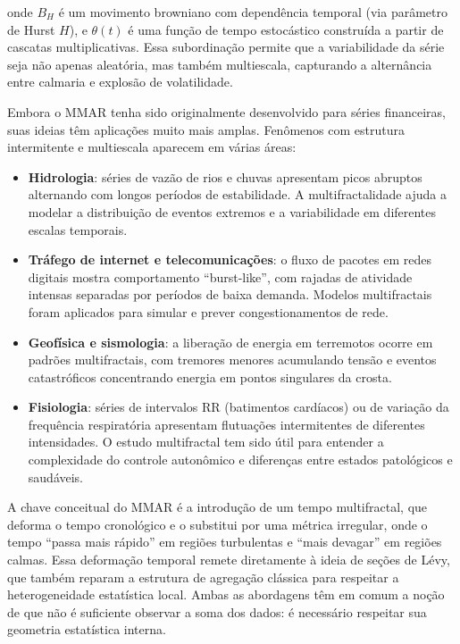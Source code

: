 \documentclass[
]{agujournal2019}
\providecommand{\tightlist}{%
  \setlength{\itemsep}{0pt}\setlength{\parskip}{0pt}}\usepackage{longtable,booktabs,array}
\begin{document}
onde \(B_H\) é um movimento browniano com dependência temporal (via
parâmetro de Hurst \(H\)), e \(\theta(t)\) é uma função de tempo
estocástico construída a partir de cascatas multiplicativas. Essa
subordinação permite que a variabilidade da série seja não apenas
aleatória, mas também multiescala, capturando a alternância entre
calmaria e explosão de volatilidade.

Embora o MMAR tenha sido originalmente desenvolvido para séries
financeiras, suas ideias têm aplicações muito mais amplas. Fenômenos com
estrutura intermitente e multiescala aparecem em várias áreas:

\begin{itemize}
\tightlist
\item
  \textbf{Hidrologia}: séries de vazão de rios e chuvas apresentam picos
  abruptos alternando com longos períodos de estabilidade. A
  multifractalidade ajuda a modelar a distribuição de eventos extremos e
  a variabilidade em diferentes escalas temporais.
\item
  \textbf{Tráfego de internet e telecomunicações}: o fluxo de pacotes em
  redes digitais mostra comportamento ``burst-like'', com rajadas de
  atividade intensas separadas por períodos de baixa demanda. Modelos
  multifractais foram aplicados para simular e prever congestionamentos
  de rede.
\item
  \textbf{Geofísica e sismologia}: a liberação de energia em terremotos
  ocorre em padrões multifractais, com tremores menores acumulando
  tensão e eventos catastróficos concentrando energia em pontos
  singulares da crosta.
\item
  \textbf{Fisiologia}: séries de intervalos RR (batimentos cardíacos) ou
  de variação da frequência respiratória apresentam flutuações
  intermitentes de diferentes intensidades. O estudo multifractal tem
  sido útil para entender a complexidade do controle autonômico e
  diferenças entre estados patológicos e saudáveis.
\end{itemize}

A chave conceitual do MMAR é a introdução de um tempo multifractal, que
deforma o tempo cronológico e o substitui por uma métrica irregular,
onde o tempo ``passa mais rápido'' em regiões turbulentas e ``mais
devagar'' em regiões calmas. Essa deformação temporal remete diretamente
à ideia de seções de Lévy, que também reparam a estrutura de agregação
clássica para respeitar a heterogeneidade estatística local. Ambas as
abordagens têm em comum a noção de que não é suficiente observar a soma
dos dados: é necessário respeitar sua geometria estatística interna.
\end{document}
